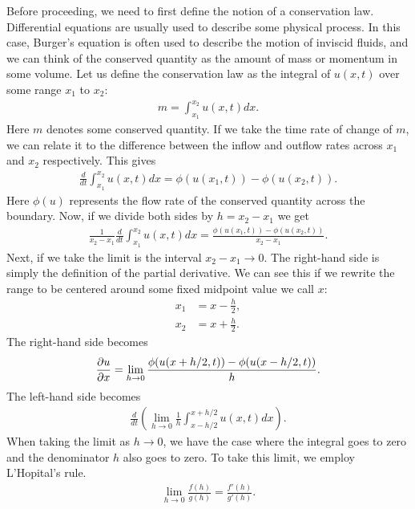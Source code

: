 Before proceeding, we need to first define the notion of a conservation law. Differential equations are usually used to describe some physical process. In this case, Burger's equation is often used to describe the motion of inviscid fluids, and we can think of the conserved quantity as the amount of mass or momentum in some volume. Let us define the conservation law as the integral of $u(x,t)$ over some range $x_1$ to $x_2$:
\begin{align}
  m = \int_{x_1}^{x_2} u(x,t) dx .
\end{align}
Here $m$ denotes some conserved quantity. If we take the time rate of change of $m$, we can relate it to the difference between the inflow and outflow rates across $x_1$ and $x_2$ respectively. This gives
\begin{align}
  \frac{d}{dt} \int_{x_1}^{x_2} u(x,t) dx = \phi(u(x_1,t)) - \phi(u(x_2,t)).
\end{align}
Here $\phi(u)$ represents the flow rate of the conserved quantity across the boundary. Now, if we divide both sides by $h = x_2 - x_1$ we get
\begin{align}
  \frac{1}{x_2 - x_1} \frac{d}{dt} \int_{x_1}^{x_2} u(x,t) dx = \frac{ \phi(u(x_1,t)) - \phi(u(x_2,t)) }{ x_2 - x_1 }.
\end{align}
Next, if we take the limit is the interval $x_2 - x_1 \rightarrow 0$. The right-hand side is simply the definition of the partial derivative. We can see this if we rewrite the range to be centered around some fixed midpoint value we call $x$:
\begin{subequations}
\begin{align}
  x_1 &= x - \frac{h}{2}, \\
  x_2 &= x + \frac{h}{2}.
\end{align}
\end{subequations}
The right-hand side becomes
\begin{align}
  \frac{ \partial {u} }{ \partial {x} } = \lim_{h \rightarrow 0 } \frac{ \phi(u(x + h/2,t)) - \phi(u(x - h/2,t)) }{ h }.
\end{align}
The left-hand side becomes
\begin{align}
 \frac{d}{dt} \left(  \lim_{h \rightarrow 0 }  \frac{1}{h}  \int_{x - h/2}^{x + h/2} u(x,t) dx \right).
\end{align}
When taking the limit as $h \rightarrow 0$, we have the case where the integral goes to zero and the denominator $h$ also goes to zero. To take this limit, we employ L'Hopital's rule.
\begin{align}
  \lim_{h \rightarrow 0 } \frac{f(h)}{g(h)} = \frac{ f'(h) }{ g'(h) } .
\end{align}
